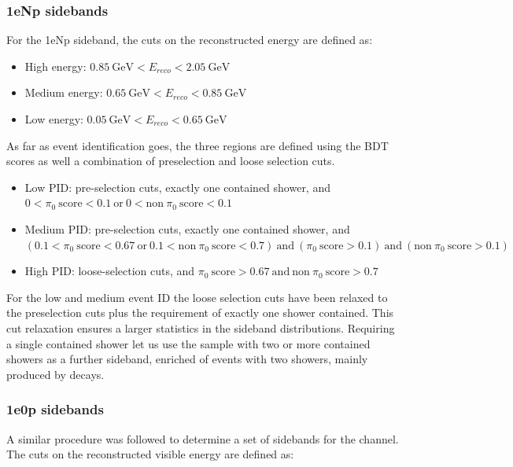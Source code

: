 \subsubsection{1eNp sidebands}

For the 1eNp sideband, the cuts on the reconstructed energy are defined as:
\begin{itemize}
    \item High energy: $0.85 ~\text{GeV} < E_{reco} < 2.05 ~\text{GeV}$
    \item Medium energy: $0.65 ~\text{GeV} < E_{reco} < 0.85 ~\text{GeV}$
    \item Low energy: $0.05 ~\text{GeV} < E_{reco} < 0.65 ~\text{GeV}$
\end{itemize}

As far as event identification goes, the three regions are defined using the BDT scores as well a combination of preselection and loose selection cuts.
\begin{itemize}
    \item Low PID: pre-selection cuts, exactly one contained shower, and $0 < \pi_0~\text{score} < 0.1 ~\text{or}~ 0 < \text{non}~\pi_0~\text{score} < 0.1 $
    \item Medium PID: pre-selection cuts, exactly one contained shower, and $(0.1 < \pi_0~\text{score} < 0.67 ~\text{or}~ 0.1 < \text{non}~\pi_0~\text{score} < 0.7) ~\text{and}~  (\pi_0~\text{score} > 0.1) ~\text{and}~ (\text{non}~\pi_0~\text{score} > 0.1)$
    \item High PID: loose-selection cuts, and $ \pi_0~\text{score} > 0.67 ~\text{and}~ \text{non}~\pi_0~\text{score} > 0.7 $
\end{itemize}
For the low and medium event ID the loose selection cuts have been relaxed to the preselection cuts plus the requirement of exactly one shower contained.
This cut relaxation ensures a larger statistics in the sideband distributions.
Requiring a single contained shower let us use the sample with two or more contained showers as a further sideband, enriched of events with two showers, mainly produced by \pizero decays.

\subsubsection{1e0p sidebands}
A similar procedure was followed to determine a set of sidebands for the \nueccnopinop channel. The cuts on the reconstructed visible energy are defined as:

